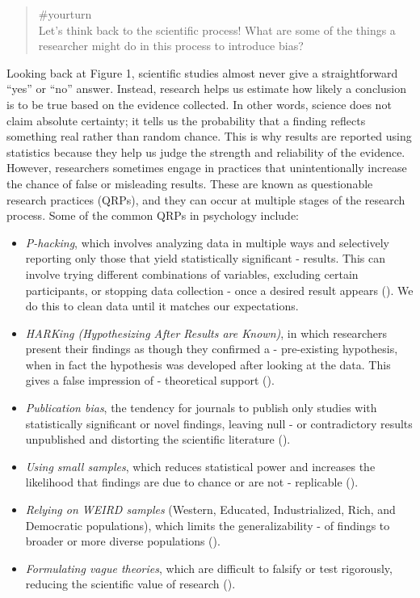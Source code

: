 \documentclass[
  letterpaper,
]{book}
\providecommand{\tightlist}{%
  \setlength{\itemsep}{0pt}\setlength{\parskip}{0pt}}\usepackage{longtable,booktabs,array}
\begin{document}
\begin{quote}
{\#yourturn}\\
Let's think back to the scientific process! What are some of the things
a researcher might do in this process to introduce bias?
\end{quote}

Looking back at Figure 1, scientific studies almost never give a
straightforward ``yes'' or ``no'' answer. Instead, research helps us
estimate how likely a conclusion is to be true based on the evidence
collected. In other words, science does not claim absolute certainty; it
tells us the probability that a finding reflects something real rather
than random chance. This is why results are reported using statistics
because they help us judge the strength and reliability of the evidence.
However, researchers sometimes engage in practices that unintentionally
increase the chance of false or misleading results. These are known as
questionable research practices (QRPs), and they can occur at multiple
stages of the research process. Some of the common QRPs in psychology
include:

\begin{itemize}
\tightlist
\item
  \emph{P-hacking}, which involves analyzing data in multiple ways and
  selectively reporting only those that yield statistically significant
  - results. This can involve trying different combinations of
  variables, excluding certain participants, or stopping data collection
  - once a desired result appears
  (). We do
  this to clean data until it matches our expectations.
\item
  \emph{HARKing (Hypothesizing After Results are Known)}, in which
  researchers present their findings as though they confirmed a -
  pre-existing hypothesis, when in fact the hypothesis was developed
  after looking at the data. This gives a false impression of -
  theoretical support ().
\item
  \emph{Publication bias}, the tendency for journals to publish only
  studies with statistically significant or novel findings, leaving null
  - or contradictory results unpublished and distorting the scientific
  literature ().
\item
  \emph{Using small samples}, which reduces statistical power and
  increases the likelihood that findings are due to chance or are not -
  replicable ().
\item
  \emph{Relying on WEIRD samples} (Western, Educated, Industrialized,
  Rich, and Democratic populations), which limits the generalizability -
  of findings to broader or more diverse populations
  ().
\item
  \emph{Formulating vague theories}, which are difficult to falsify or
  test rigorously, reducing the scientific value of research
  ().
\end{itemize}
\end{document}
